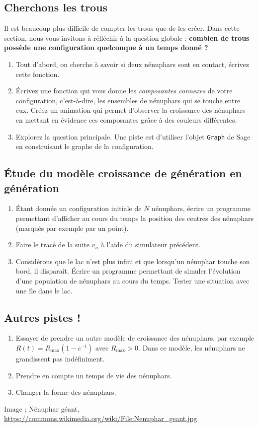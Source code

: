\documentclass{../ficheTDTP}
\begin{document}
\subsection{Cherchons les trous}

Il est beaucoup plus difficile de compter les trous que de les créer. Dans cette section, nous vous invitons à réfléchir à la question globale : \textbf{combien de trous possède une configuration quelconque à un temps donné ?}

\begin{enumerate}

\item Tout d'abord, on cherche à savoir si deux nénuphars sont en contact, écrivez cette fonction.

\item Écrivez une fonction qui vous donne les \textit{composantes connexes} de votre configuration, c'est-à-dire, les ensembles de nénuphars qui se touche entre eux. Créez un animation qui permet d'observer la croissance des nénuphars en mettant en évidence ces composantes grâce à des couleurs différentes.

\item Explorez la question principale. Une piste est d'utiliser l'objet \texttt{Graph} de Sage en construisant le graphe de la configuration.

\end{enumerate}

\subsection{Étude du modèle \og croissance de génération en génération\fg}
\begin{enumerate}
	\item Étant donnée un configuration initiale de $N$ nénuphars, écrire un programme permettant d'afficher au cours du temps la position des centres des nénuphars (marqués par exemple par un point).
	\item Faire le tracé de la suite $v_n$ à l'aide du simulateur précédent.
	\item Considérons que le lac n'est plus infini et que lorsqu'un nénuphar touche son bord, il disparaît. Écrire un programme permettant de simuler l'évolution d'une population de nénuphars au cours du temps. Tester une situation avec une île dans le lac.
\end{enumerate}


\subsection{Autres pistes !}
\begin{enumerate}
	\item Essayer de prendre un autre modèle de croissance des nénuphars, par exemple $R(t) = R_\mathrm{max} (1- e^{-t})$ avec $R_\mathrm{max}>0$. Dans ce modèle, les nénuphars ne grandissent pas indéfiniment.
	\item Prendre en compte un temps de vie des nénuphars.
	\item Changer la forme des nénuphars.
\end{enumerate}

\vspace{2cm}
\footnotesize{Image : Nénuphar géant, \url{https://commons.wikimedia.org/wiki/File:Nenuphar_geant.jpg}}
\end{document}
